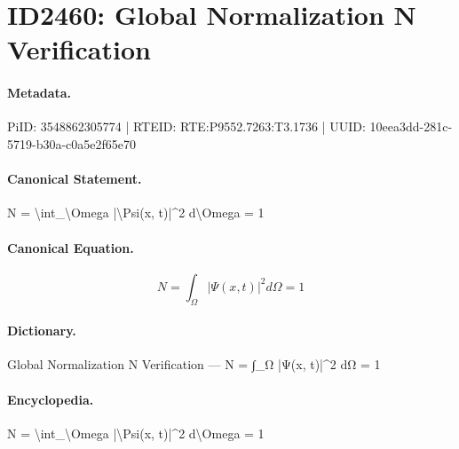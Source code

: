 \section*{ID2460: Global Normalization N Verification}
\paragraph{Metadata.}
PiID: 3548862305774 | RTEID: RTE:P9552.7263:T3.1736 | UUID: 10eea3dd-281c-5719-b30a-c0a5e2f65e70

\paragraph{Canonical Statement.}
N = \textbackslash{}int\_\textbackslash{}Omega |\textbackslash{}Psi(x, t)|\textasciicircum{}2 d\textbackslash{}Omega = 1

\paragraph{Canonical Equation.}
\[
N = \int_\Omega |\Psi(x, t)|^2 d\Omega = 1
\]

\paragraph{Dictionary.}
Global Normalization N Verification — N = ∫\_Ω |Ψ(x, t)|\textasciicircum{}2 dΩ = 1

\paragraph{Encyclopedia.}
N = \textbackslash{}int\_\textbackslash{}Omega |\textbackslash{}Psi(x, t)|\textasciicircum{}2 d\textbackslash{}Omega = 1
